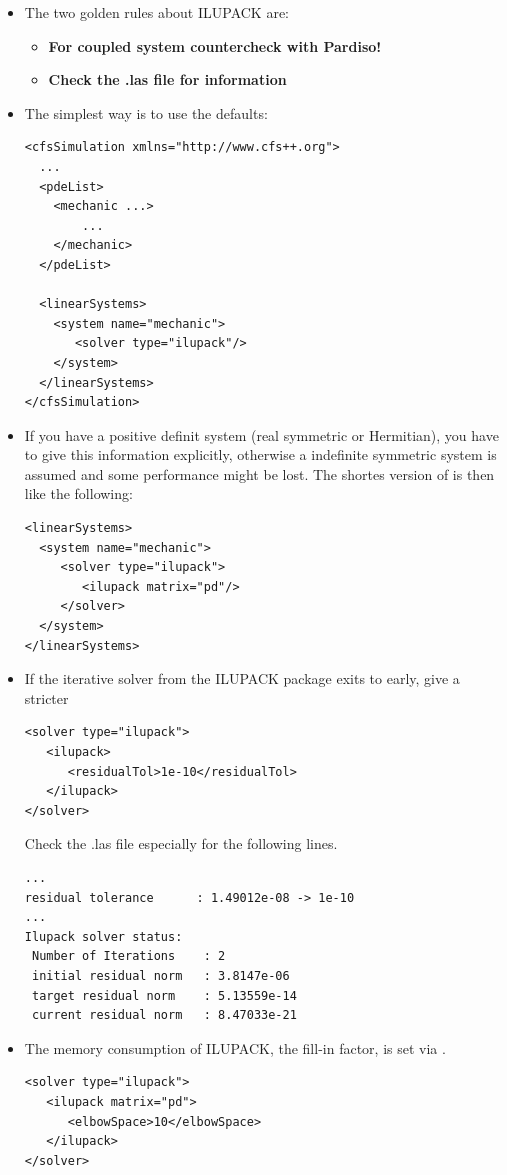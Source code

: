 \begin{itemize}
\item
The two golden rules about ILUPACK are:
\begin{itemize}
\item \textbf{For coupled system countercheck with Pardiso!}
\item \textbf{Check the .las file for information}
\end{itemize}

\item The simplest way is to use the defaults:
\begin{verbatim}
<cfsSimulation xmlns="http://www.cfs++.org">
  ...
  <pdeList>
    <mechanic ...>
        ...
    </mechanic>
  </pdeList>
  
  <linearSystems>
    <system name="mechanic">
       <solver type="ilupack"/>
    </system>
  </linearSystems>
</cfsSimulation>
\end{verbatim}

\item If you have a positive definit system (real symmetric or Hermitian), you have to give this information explicitly, otherwise a indefinite symmetric system is assumed and some performance might be lost. The shortes version of  is then like the following:
\begin{verbatim}
<linearSystems>
  <system name="mechanic">
     <solver type="ilupack">
        <ilupack matrix="pd"/>
     </solver>
  </system>
</linearSystems>
\end{verbatim}
\item If the iterative solver from the ILUPACK package exits to early, give a stricter  
\begin{verbatim}
<solver type="ilupack">
   <ilupack>
      <residualTol>1e-10</residualTol>
   </ilupack>
</solver>
\end{verbatim}
Check the .las file especially for the following lines.
\begin{verbatim}
...
residual tolerance      : 1.49012e-08 -> 1e-10
...
Ilupack solver status:
 Number of Iterations    : 2
 initial residual norm   : 3.8147e-06
 target residual norm    : 5.13559e-14
 current residual norm   : 8.47033e-21
\end{verbatim}
\item The memory consumption of ILUPACK, the fill-in factor, is set via .
\begin{verbatim}
<solver type="ilupack">
   <ilupack matrix="pd">
      <elbowSpace>10</elbowSpace>
   </ilupack>
</solver>
\end{verbatim}
\end{itemize}

